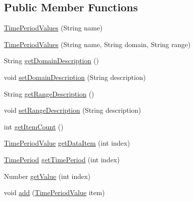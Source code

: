 \subsection*{Public Member Functions}
\begin{DoxyCompactItemize}
\item 
\mbox{\hyperlink{classorg_1_1jfree_1_1data_1_1time_1_1_time_period_values_a0dd8d3fd9453a5e18d24e7b9f10f346c}{Time\+Period\+Values}} (String name)
\item 
\mbox{\hyperlink{classorg_1_1jfree_1_1data_1_1time_1_1_time_period_values_a0228f920440b8e63a80b8c5c26a2f3fa}{Time\+Period\+Values}} (String name, String domain, String range)
\item 
String \mbox{\hyperlink{classorg_1_1jfree_1_1data_1_1time_1_1_time_period_values_a75e780afe26b96d7adc5ab6518818d14}{get\+Domain\+Description}} ()
\item 
void \mbox{\hyperlink{classorg_1_1jfree_1_1data_1_1time_1_1_time_period_values_aac7ff6c5c3cb5112bf53122aa3c516bf}{set\+Domain\+Description}} (String description)
\item 
String \mbox{\hyperlink{classorg_1_1jfree_1_1data_1_1time_1_1_time_period_values_a7339bc03c769eac3b89517378667b94a}{get\+Range\+Description}} ()
\item 
void \mbox{\hyperlink{classorg_1_1jfree_1_1data_1_1time_1_1_time_period_values_a16ace4528f97c1fc68d5edb578373092}{set\+Range\+Description}} (String description)
\item 
int \mbox{\hyperlink{classorg_1_1jfree_1_1data_1_1time_1_1_time_period_values_a45a779236ab4207245c09d8d85592e77}{get\+Item\+Count}} ()
\item 
\mbox{\hyperlink{classorg_1_1jfree_1_1data_1_1time_1_1_time_period_value}{Time\+Period\+Value}} \mbox{\hyperlink{classorg_1_1jfree_1_1data_1_1time_1_1_time_period_values_acfb6760194a12e035ba7fe02d45dd099}{get\+Data\+Item}} (int index)
\item 
\mbox{\hyperlink{interfaceorg_1_1jfree_1_1data_1_1time_1_1_time_period}{Time\+Period}} \mbox{\hyperlink{classorg_1_1jfree_1_1data_1_1time_1_1_time_period_values_a31d30128454c319ea9d48777a00fb887}{get\+Time\+Period}} (int index)
\item 
Number \mbox{\hyperlink{classorg_1_1jfree_1_1data_1_1time_1_1_time_period_values_ac4d580867da852cbade6c44e67bb4e22}{get\+Value}} (int index)
\item 
void \mbox{\hyperlink{classorg_1_1jfree_1_1data_1_1time_1_1_time_period_values_a3498870da992d08f1bcf3fff2cab45f5}{add}} (\mbox{\hyperlink{classorg_1_1jfree_1_1data_1_1time_1_1_time_period_value}{Time\+Period\+Value}} item)

\end{DoxyCompactItemize}
